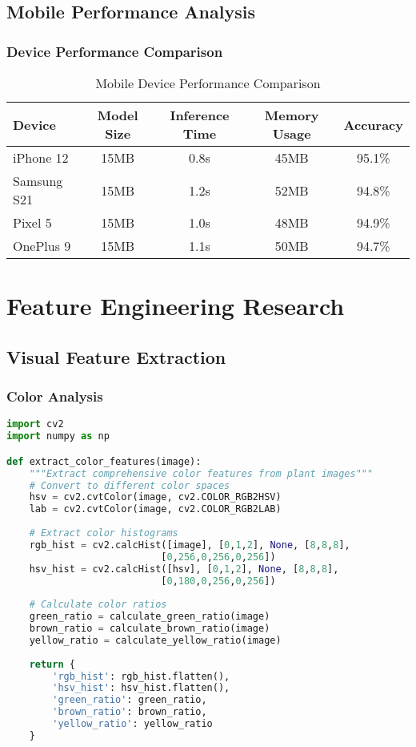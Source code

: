 \documentclass[12pt,a4paper]{article}
\begin{document}
\subsection{Mobile Performance Analysis}

\subsubsection{Device Performance Comparison}
\begin{table}[H]
\centering
\begin{tabular}{|l|c|c|c|c|}
\hline
\textbf{Device} & \textbf{Model Size} & \textbf{Inference Time} & \textbf{Memory Usage} & \textbf{Accuracy} \\
\hline
iPhone 12 & 15MB & 0.8s & 45MB & 95.1\% \\
Samsung S21 & 15MB & 1.2s & 52MB & 94.8\% \\
Pixel 5 & 15MB & 1.0s & 48MB & 94.9\% \\
OnePlus 9 & 15MB & 1.1s & 50MB & 94.7\% \\
\hline
\end{tabular}
\caption{Mobile Device Performance Comparison}
\end{table}

\section{Feature Engineering Research}

\subsection{Visual Feature Extraction}

\subsubsection{Color Analysis}
\begin{lstlisting}[language=Python, caption=Color Feature Extraction]
import cv2
import numpy as np

def extract_color_features(image):
    """Extract comprehensive color features from plant images"""
    # Convert to different color spaces
    hsv = cv2.cvtColor(image, cv2.COLOR_RGB2HSV)
    lab = cv2.cvtColor(image, cv2.COLOR_RGB2LAB)
    
    # Extract color histograms
    rgb_hist = cv2.calcHist([image], [0,1,2], None, [8,8,8], 
                           [0,256,0,256,0,256])
    hsv_hist = cv2.calcHist([hsv], [0,1,2], None, [8,8,8], 
                           [0,180,0,256,0,256])
    
    # Calculate color ratios
    green_ratio = calculate_green_ratio(image)
    brown_ratio = calculate_brown_ratio(image)
    yellow_ratio = calculate_yellow_ratio(image)
    
    return {
        'rgb_hist': rgb_hist.flatten(),
        'hsv_hist': hsv_hist.flatten(),
        'green_ratio': green_ratio,
        'brown_ratio': brown_ratio,
        'yellow_ratio': yellow_ratio
    }
\end{lstlisting}
\end{document}
